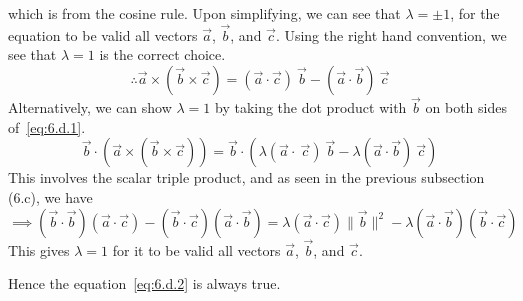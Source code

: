 which is from the cosine rule.
Upon simplifying, we can see that \( \lambda = \pm 1 \), for the equation to be valid all vectors \( \vec{a} \), \( \vec{b} \), and \( \vec{c} \).
Using the right hand convention, we see that \( \lambda =  1 \) is the correct choice.
\begin{equation}
    \therefore \vec{a} \times (\vec{b} \times \vec{c}) = (\vec{a} \cdot \vec{c})\ \vec{b} - (\vec{a} \cdot \vec{b})\ \vec{c}
    \tag{6.d.2}
    \label{eq:6.d.2}
\end{equation}
Alternatively, we can show \( \lambda = 1 \) by taking the dot product with \( \vec{b} \) on both sides of~\eqref{eq:6.d.1}.
\[
    \vec{b} \cdot (\vec{a} \times (\vec{b} \times \vec{c})) = \vec{b} \cdot (\lambda (\vec{a} \cdot \ \vec{c})\ \vec{b} - \lambda (\vec{a} \cdot \vec{b})\ \vec{c})
\]
This involves the scalar triple product, and as seen in the previous subsection (6.c), we have
\[
    \implies
    (\vec{b} \cdot \vec{b})(\vec{a} \cdot \vec{c}) - (\vec{b} \cdot \vec{c})(\vec{a} \cdot \vec{b})
    = \lambda (\vec{a} \cdot \vec{c}) \lVert \vec{b} \rVert^2 - \lambda (\vec{a} \cdot \vec{b})(\vec{b} \cdot \vec{c})
\]
This gives \( \lambda = 1 \) for it to be valid all vectors \( \vec{a} \), \( \vec{b} \), and \( \vec{c} \).

Hence the equation~\eqref{eq:6.d.2} is always true.
